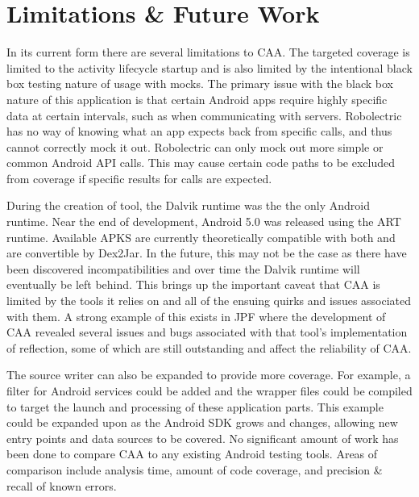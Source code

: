 \documentclass[conference]{IEEEtran}
\begin{document}
\section{Limitations \& Future Work}
\label{sec: limitations}


In its current form there are several limitations to CAA. The targeted coverage is limited to the activity lifecycle startup and is also limited by the intentional black box testing nature of usage with mocks. The primary issue with the black box nature of this application is that certain Android apps require highly specific data at certain intervals, such as when communicating with servers. Robolectric has no way of knowing what an app expects back from specific calls, and thus cannot correctly mock it out. Robolectric can only mock out more simple or common Android API calls. This may cause certain code paths to be excluded from coverage if specific results for calls are expected.

During the creation of tool, the Dalvik runtime was the the only Android runtime. Near the end of development, Android 5.0 was released using the ART runtime. Available APKS are currently theoretically compatible with both and are convertible by Dex2Jar. In the future, this may not be the case as there have been discovered incompatibilities and over time the Dalvik runtime will eventually be left behind.  This brings up the important caveat that CAA is limited by the tools it relies on and all of the ensuing quirks and issues associated with them.  A strong example of this exists in JPF where the development of CAA revealed several issues and bugs associated with that tool's implementation of reflection, some of which are still outstanding and affect the reliability of CAA.



The source writer can also be expanded to provide more coverage. For example, a filter for Android services could be added and the wrapper files could be compiled to target the launch and processing of these application parts. This example could be expanded upon as the Android SDK grows and changes, allowing new entry points and data sources to be covered. No significant amount of work has been done to compare CAA to any existing Android testing tools. Areas of comparison include analysis time, amount of code coverage, and precision \& recall of known errors.
\end{document}
